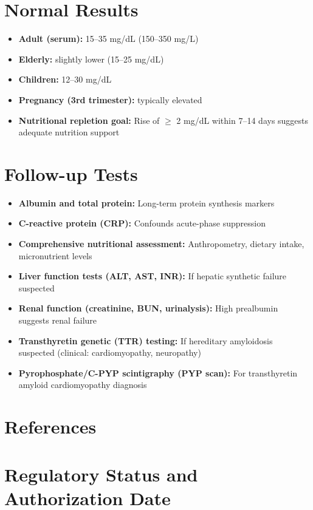 \section*{Normal Results}
\begin{itemize}
  \item \textbf{Adult (serum):} 15--35 mg/dL (150--350 mg/L)
  \item \textbf{Elderly:} slightly lower (15--25 mg/dL)
  \item \textbf{Children:} 12--30 mg/dL
  \item \textbf{Pregnancy (3rd trimester):} typically elevated
  \item \textbf{Nutritional repletion goal:} Rise of $\geq$ 2 mg/dL within 7--14 days suggests adequate nutrition support
\end{itemize}

\section*{Follow-up Tests}
\begin{itemize}
  \item \textbf{Albumin and total protein:} Long-term protein synthesis markers
  \item \textbf{C-reactive protein (CRP):} Confounds acute-phase suppression
  \item \textbf{Comprehensive nutritional assessment:} Anthropometry, dietary intake, micronutrient levels
  \item \textbf{Liver function tests (ALT, AST, INR):} If hepatic synthetic failure suspected
  \item \textbf{Renal function (creatinine, BUN, urinalysis):} High prealbumin suggests renal failure
  \item \textbf{Transthyretin genetic (TTR) testing:} If hereditary amyloidosis suspected (clinical: cardiomyopathy, neuropathy)
  \item \textbf{Pyrophosphate/C-PYP scintigraphy (PYP scan):} For transthyretin amyloid cardiomyopathy diagnosis
\end{itemize}

\section*{References}



\clearpage
\section*{Regulatory Status and Authorization Date}

\clearpage

